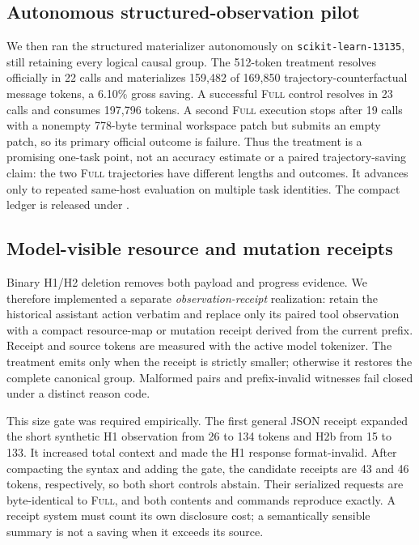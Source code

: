 \documentclass[11pt]{article}
\begin{document}
\subsection{Autonomous structured-observation pilot}

We then ran the structured materializer autonomously on
\texttt{scikit-learn-13135}, still retaining every logical causal group.  The
512-token treatment resolves officially in 22 calls and materializes 159,482
of 169,850 trajectory-counterfactual message tokens, a 6.10\% gross saving. A
successful \textsc{Full} control resolves in 23 calls and consumes 197,796
tokens. A second \textsc{Full} execution stops after 19 calls with a nonempty
778-byte terminal workspace patch but submits an empty patch, so its primary
official outcome is failure. Thus the treatment is a promising one-task point,
not an accuracy estimate or a paired trajectory-saving claim: the two
\textsc{Full} trajectories have different lengths and outcomes. It advances
only to repeated same-host evaluation on multiple task identities. The compact
ledger is released under .

\subsection{Model-visible resource and mutation receipts}

Binary H1/H2 deletion removes both payload and progress evidence.  We therefore
implemented a separate \emph{observation-receipt} realization: retain the
historical assistant action verbatim and replace only its paired tool
observation with a compact resource-map or mutation receipt derived from the
current prefix.  Receipt and source tokens are measured with the active model
tokenizer.  The treatment emits only when the receipt is strictly smaller;
otherwise it restores the complete canonical group.  Malformed pairs and
prefix-invalid witnesses fail closed under a distinct reason code.

This size gate was required empirically.  The first general JSON receipt
expanded the short synthetic H1 observation from 26 to 134 tokens and H2b from
15 to 133.  It increased total context and made the H1 response format-invalid.
After compacting the syntax and adding the gate, the candidate receipts are 43
and 46 tokens, respectively, so both short controls abstain.  Their serialized
requests are byte-identical to \textsc{Full}, and both contents and commands
reproduce exactly.  A receipt system must count its own disclosure cost; a
semantically sensible summary is not a saving when it exceeds its source.
\end{document}
